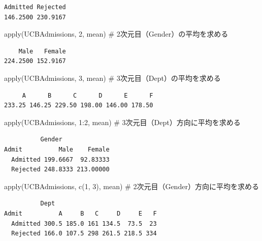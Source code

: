\documentclass[
  letterpaper,
  DIV=11,
  numbers=noendperiod]{scrreprt}
\newenvironment{Shaded}{\begin{snugshade}}{\end{snugshade}}
\newcommand{\CommentTok}[1]{\textcolor[rgb]{0.37,0.37,0.37}{#1}}
\newcommand{\DecValTok}[1]{\textcolor[rgb]{0.68,0.00,0.00}{#1}}
\newcommand{\FunctionTok}[1]{\textcolor[rgb]{0.28,0.35,0.67}{#1}}
\newcommand{\NormalTok}[1]{\textcolor[rgb]{0.00,0.23,0.31}{#1}}
\newcommand{\SpecialCharTok}[1]{\textcolor[rgb]{0.37,0.37,0.37}{#1}}
\begin{document}
\begin{verbatim}
Admitted Rejected 
146.2500 230.9167 
\end{verbatim}

\begin{Shaded}
\begin{Highlighting}[]
\FunctionTok{apply}\NormalTok{(UCBAdmissions, }\DecValTok{2}\NormalTok{, mean) }\CommentTok{\# 2次元目（Gender）の平均を求める}
\end{Highlighting}
\end{Shaded}

\begin{verbatim}
    Male   Female 
224.2500 152.9167 
\end{verbatim}

\begin{Shaded}
\begin{Highlighting}[]
\FunctionTok{apply}\NormalTok{(UCBAdmissions, }\DecValTok{3}\NormalTok{, mean) }\CommentTok{\# 3次元目（Dept）の平均を求める}
\end{Highlighting}
\end{Shaded}

\begin{verbatim}
     A      B      C      D      E      F 
233.25 146.25 229.50 198.00 146.00 178.50 
\end{verbatim}

\begin{Shaded}
\begin{Highlighting}[]
\FunctionTok{apply}\NormalTok{(UCBAdmissions, }\DecValTok{1}\SpecialCharTok{:}\DecValTok{2}\NormalTok{, mean) }\CommentTok{\# 3次元目（Dept）方向に平均を求める}
\end{Highlighting}
\end{Shaded}

\begin{verbatim}
          Gender
Admit          Male    Female
  Admitted 199.6667  92.83333
  Rejected 248.8333 213.00000
\end{verbatim}

\begin{Shaded}
\begin{Highlighting}[]
\FunctionTok{apply}\NormalTok{(UCBAdmissions, }\FunctionTok{c}\NormalTok{(}\DecValTok{1}\NormalTok{, }\DecValTok{3}\NormalTok{), mean) }\CommentTok{\# 2次元目（Gender）方向に平均を求める}
\end{Highlighting}
\end{Shaded}

\begin{verbatim}
          Dept
Admit          A     B   C     D     E   F
  Admitted 300.5 185.0 161 134.5  73.5  23
  Rejected 166.0 107.5 298 261.5 218.5 334
\end{verbatim}
\end{document}
